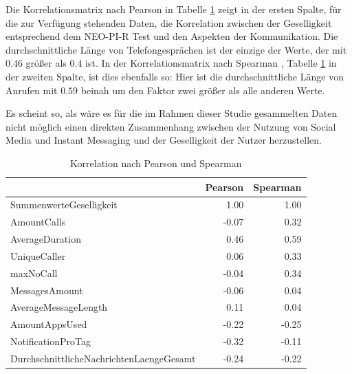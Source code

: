 Die Korrelationsmatrix nach Pearson in Tabelle \ref{cormatrix} zeigt in der ersten Spalte, für die zur Verfügung stehenden Daten, die Korrelation zwischen der Geselligkeit entsprechend dem NEO-PI-R Test und den Aspekten der Kommunikation.
Die durchschnittliche Länge von Telefongesprächen ist der einzige der Werte, der mit $0.46$ größer als $0.4$ ist.
In der Korrelationsmatrix nach Spearman , Tabelle \ref{cormatrix} in der zweiten Spalte,  ist dies ebenfalls so: Hier ist die durchschnittliche Länge von Anrufen mit $0.59$ beinah um den Faktor zwei größer als alle anderen Werte.

\par
Es scheint so, als wäre es für die im Rahmen dieser Studie gesammelten Daten nicht möglich einen direkten Zusammenhang zwischen der Nutzung von Social Media und Instant Messaging und der Geselligkeit der Nutzer herzustellen.

\begin{table}[]
\centering
\caption{Korrelation nach Pearson und Spearman}
\label{cormatrix}
\begin{tabular}{@{}lrr@{}}
\toprule
                                         & \multicolumn{1}{l}{Pearson} & \multicolumn{1}{l}{Spearman} \\ \midrule
SummenwerteGeselligkeit                  & 1.00                        & 1.00                         \\
AmountCalls                              & -0.07                       & 0.32                         \\
AverageDuration                          & 0.46                        & 0.59                         \\
UniqueCaller                             & 0.06                        & 0.33                         \\
maxNoCall                                & -0.04                       & 0.34                         \\
MessagesAmount                           & -0.06                       & 0.04                         \\
AverageMessageLength                     & 0.11                        & 0.04                         \\
AmountAppsUsed                           & -0.22                       & -0.25                        \\
NotificationProTag                       & -0.32                       & -0.11                        \\
DurchschnittlicheNachrichtenLaengeGesamt & -0.24                       & -0.22                        \\ \bottomrule
\end{tabular}
\end{table}

